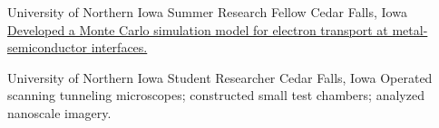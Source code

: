 		{University of Northern Iowa}
		{Summer Research Fellow}
		{Cedar Falls, Iowa}{}
		{\href{http://byron.tasseff.com/documents/reports/2010-ballistic_transport_at_metal_semiconductor_interfaces.pdf}{Developed a Monte Carlo simulation model for electron transport at metal-semiconductor interfaces.}}

		{University of Northern Iowa}
		{Student Researcher}
		{Cedar Falls, Iowa}{}
		{Operated scanning tunneling microscopes; constructed small test chambers; analyzed nanoscale imagery.}
